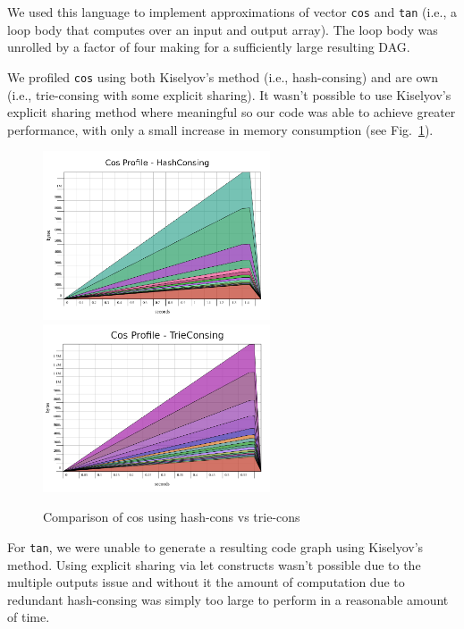 \documentclass[runningheads]{llncs}
\begin{document}
We used this language to implement approximations of vector
\texttt{cos} and \texttt{tan} (i.e., a loop body that
computes over an input and output array). The loop body was unrolled by a factor
of four making for a sufficiently large resulting DAG.

We profiled \texttt{cos} using both Kiselyov's method (i.e., hash-consing) and are own
(i.e., trie-consing with some explicit sharing). It wasn't possible to use
Kiselyov's explicit sharing method where meaningful so our code was able to
achieve greater performance, with only a small increase in memory consumption
(see Fig.~\ref{fig:hashvscons}).

\begin{figure}[!h]
  \centering
  \includegraphics[width=0.6\textwidth]{figs/cos_profile_hashcons_cropped.png}
  \includegraphics[width=0.6\textwidth]{figs/cos_profile_triecons_cropped.png}
  \caption{Comparison of cos using hash-cons vs trie-cons}
  \label{fig:hashvscons}
\end{figure}


For \texttt{tan}, we were unable to generate a resulting code graph using Kiselyov's
method. Using explicit sharing via let constructs wasn't possible due to the
multiple outputs issue and without it the amount of computation due to redundant
hash-consing was simply too large to perform in a reasonable amount of time.
\end{document}
